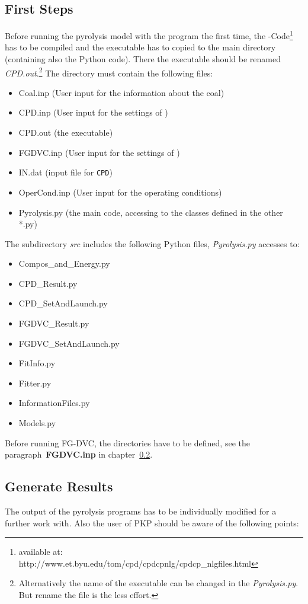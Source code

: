 \subsection{First Steps}\label{SS_1stSteps}
Before running the \CPD pyrolysis model with the program the first time, the \CPD-Code\footnote{available at: http://www.et.byu.edu/\texttildelow tom/cpd/cpdcpnlg/cpdcp\_nlgfiles.html} has to be compiled and the executable has to copied to the main directory (containing also the Python code). There the \CPD executable should be renamed \emph{CPD.out}.\footnote{Alternatively the name of the executable can be changed in the \emph{Pyrolysis.py}. But rename the file is the less effort.}
The directory must contain the following files:
\begin{itemize}
 \item Coal.inp (User input for the information about the coal)
 \item CPD.inp (User input for the settings of \CPD)
 \item CPD.out (the \CPD executable)
 \item FGDVC.inp (User input for the settings of \FGDVC)
 \item IN.dat (input file for \texttt{CPD})
 \item OperCond.inp (User input for the operating conditions)
 \item Pyrolysis.py (the main code, accessing to the classes defined in the other *.py)
\end{itemize}
The subdirectory \textit{src} includes the following Python files, \textit{Pyrolysis.py} accesses to:
\begin{itemize}
 \item Compos\_and\_Energy.py
 \item CPD\_Result.py
 \item CPD\_SetAndLaunch.py
 \item FGDVC\_Result.py
 \item FGDVC\_SetAndLaunch.py
 \item FitInfo.py
 \item Fitter.py
 \item InformationFiles.py
 \item Models.py
\end{itemize}
Before running FG-DVC, the directories have to be defined, see the paragraph~\textbf{FGDVC.inp} in chapter~\ref{SS_Generate_Results}.


\subsection{Generate Results}\label{SS_Generate_Results}
The output of the pyrolysis programs has to be individually modified for a further work with. Also the user of PKP should be aware of the following points:
